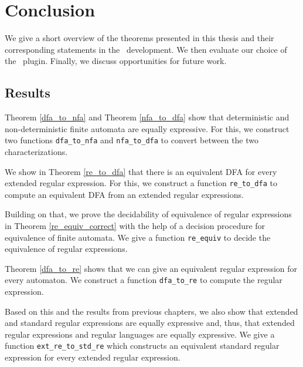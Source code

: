 \chapter{Conclusion}
We give a short overview of the theorems presented in this thesis and their corresponding statements in the \coq\ development.
We then evaluate our choice of the \ssreflect\ plugin.
Finally, we discuss opportunities for future work. 

\section{Results}
\label{chap:conclusion}
Theorem \ref{dfa_to_nfa} and Theorem \ref{nfa_to_dfa} 
show that deterministic and non-deterministic finite automata are equally expressive.
For this, we construct two functions \lstinline{dfa_to_nfa} and \lstinline{nfa_to_dfa} to convert between the two characterizations.

We show in Theorem \ref{re_to_dfa} that there is an equivalent DFA for every extended regular expression. 
For this, we construct a function \lstinline{re_to_dfa} to compute an equivalent DFA from an extended regular expressions.

Building on that, we prove the decidability of equivalence of regular expressions in Theorem \ref{re_equiv_correct} with the help of a decision procedure for equivalence of finite automata.
We give a function \lstinline{re_equiv} to decide the equivalence of regular expressions.

Theorem \ref{dfa_to_re} shows that we can give an equivalent regular expression for every automaton. 
We construct a function \lstinline{dfa_to_re} to compute the regular expression.

Based on this and the results from previous chapters, we also show that extended and standard regular expressions are equally expressive and, thus, that extended regular expressions and regular languages are equally expressive.
We give a function \lstinline{ext_re_to_std_re} which constructs an equivalent standard regular expression for every extended regular expression.

